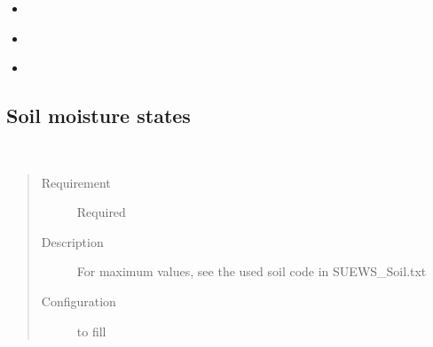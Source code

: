 \documentclass[letterpaper,10pt,english]{sphinxmanual}
\begin{document}
\begin{itemize}
\begin{itemize}
\item {} 
{\hyperref[\detokenize{input_files/Initial_Conditions/Snow_related_parameters:cmdoption-arg-snowdensgrass}]{}}

\item {} 
{\hyperref[\detokenize{input_files/Initial_Conditions/Snow_related_parameters:cmdoption-arg-snowdensbsoil}]{}}

\item {} 
{\hyperref[\detokenize{input_files/Initial_Conditions/Snow_related_parameters:cmdoption-arg-snowdenswater}]{}}

\end{itemize}

\end{itemize}


\subsection{Soil moisture states}
\label{\detokenize{input_files/Initial_Conditions/Soil_moisture_states:soil-moisture-states}}\label{\detokenize{input_files/Initial_Conditions/Soil_moisture_states::doc}}\label{\detokenize{input_files/Initial_Conditions/Soil_moisture_states:id1}}

\begin{fulllineitems}
\label{\detokenize{input_files/Initial_Conditions/Soil_moisture_states:cmdoption-arg-soilstorepavedstate}}~\begin{quote}\begin{description}
\item[{Requirement}] \leavevmode
Required

\item[{Description}] \leavevmode
For maximum values, see the used soil code in SUEWS\_Soil.txt

\item[{Configuration}] \leavevmode
to fill

\end{description}\end{quote}

\end{fulllineitems}
\end{document}
